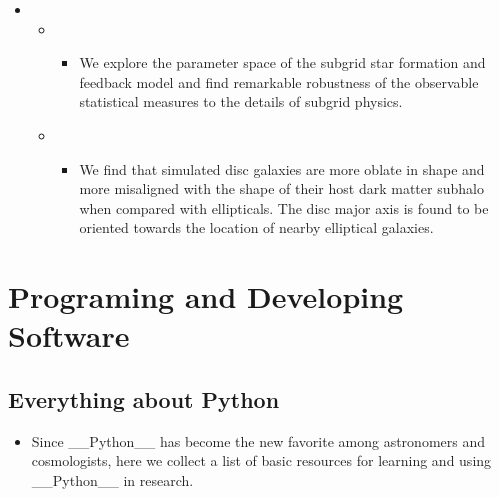 \documentclass[letterpaper,10pt,english]{sphinxmanual}
\begin{document}
\begin{itemize}
\begin{itemize}
\end{itemize}

\item {} 
\begin{itemize}
\item {} 
\begin{itemize}
\item {} 
We explore the parameter space of the subgrid star formation
and feedback model and find remarkable robustness of the
observable statistical measures to the details of subgrid
physics.

\end{itemize}

\item {} 
\begin{itemize}
\item {} 
We find that simulated disc galaxies are more oblate in shape
and more misaligned with the shape of their host dark matter
subhalo when compared with ellipticals. The disc major axis is
found to be oriented towards the location of nearby elliptical
galaxies.

\end{itemize}

\end{itemize}

\end{itemize}


\chapter{Programing and Developing Software}
\label{\detokenize{index:programing-and-developing-software}}

\section{Everything about Python}
\label{\detokenize{python:everything-about-python}}\label{\detokenize{python::doc}}\begin{itemize}
\item {} 
Since \_\_Python\_\_ has become the new favorite among astronomers and cosmologists, here we collect a list
of basic resources for learning and using \_\_Python\_\_ in research.

\end{itemize}
\end{document}
